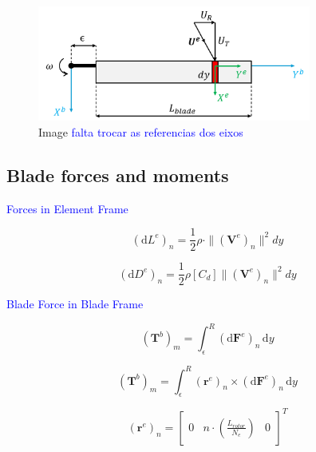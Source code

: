 \begin{figure}[!htb]
    \centering
        \includegraphics[width=9cm]{Figures/implementation/bet/blade_model.png}
        \caption{Image \textcolor{blue}{falta trocar as referencias dos eixos}}
\end{figure}


\subsection{Blade forces and moments}
\label{section:bem_forces_moments}

\textcolor{blue}{Forces in Element Frame}

\begin{equation}
    (\mathrm{d}L^{e})_n = \frac{1}{2} \rho \cdot   \|  \left( \mathbf{V}^e \right)_n \| ^2 dy
    \label{eq:elementary_lift}
\end{equation}

\begin{equation}
    (\mathrm{d}D^{e})_n = \frac{1}{2} \rho \left[ C_d \right] \|  \left( \mathbf{V}^e \right)_n \| ^2 dy
    \label{eq:elementary_drag}
\end{equation}

\textcolor{blue}{Blade Force in Blade Frame}

\begin{equation}
    \left(\mathbf{T}^{b}\right)_m = \int_\epsilon^R \left( \mathrm{d}\mathbf{F}^{e}\right)_n \, \mathrm{d}y
\end{equation}

\begin{equation}
    \left(\mathbf{T}^{b}\right)_m = \int_\epsilon^R \left(\mathbf{r}^e \right)_n \times \left( \mathrm{d}\mathbf{F}^{e}\right)_n \, \mathrm{d}y
\end{equation}


\begin{equation}
    \left(\mathbf{r}^e \right)_n = \begin{bmatrix} 0 & n \cdot \left(\frac{L_{rotor}}{N_e}\right) & 0 \end{bmatrix}^T
\end{equation}



